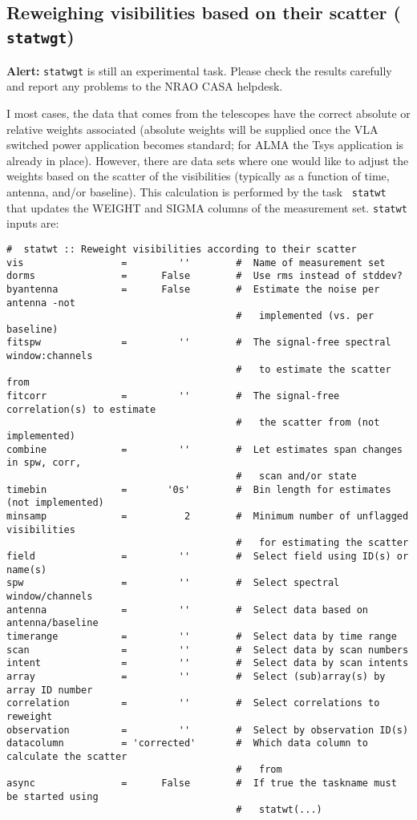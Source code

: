 \subsection{Reweighing visibilities based on their scatter ({\tt
    statwgt})}
\label{section:cal.other.statwt}

{\bf Alert:} {\tt statwgt} is still an experimental task. Please check
the results carefully and report any problems to the NRAO CASA
helpdesk. 

I most cases, the data that comes from the telescopes have the correct
absolute or relative weights associated (absolute weights will be
supplied once the VLA switched power application becomes standard; for
ALMA the Tsys application is already in place). However, there are
data sets where one would like to adjust the weights based on the
scatter of the visibilities (typically as a function of time, antenna,
and/or baseline). This calculation is performed by the task {\tt
  statwt} that updates the WEIGHT and SIGMA columns of the measurement
set. {\tt statwt} inputs are:

\small
\begin{verbatim} 
#  statwt :: Reweight visibilities according to their scatter
vis                 =         ''        #  Name of measurement set
dorms               =      False        #  Use rms instead of stddev?
byantenna           =      False        #  Estimate the noise per antenna -not
                                        #   implemented (vs. per baseline)
fitspw              =         ''        #  The signal-free spectral window:channels
                                        #   to estimate the scatter from
fitcorr             =         ''        #  The signal-free correlation(s) to estimate
                                        #   the scatter from (not implemented)
combine             =         ''        #  Let estimates span changes in spw, corr,
                                        #   scan and/or state
timebin             =       '0s'        #  Bin length for estimates (not implemented)
minsamp             =          2        #  Minimum number of unflagged visibilities
                                        #   for estimating the scatter
field               =         ''        #  Select field using ID(s) or name(s)
spw                 =         ''        #  Select spectral window/channels
antenna             =         ''        #  Select data based on antenna/baseline
timerange           =         ''        #  Select data by time range
scan                =         ''        #  Select data by scan numbers
intent              =         ''        #  Select data by scan intents
array               =         ''        #  Select (sub)array(s) by array ID number
correlation         =         ''        #  Select correlations to reweight
observation         =         ''        #  Select by observation ID(s)
datacolumn          = 'corrected'       #  Which data column to calculate the scatter
                                        #   from
async               =      False        #  If true the taskname must be started using
                                        #   statwt(...)
\end{verbatim}

